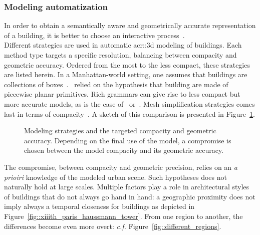         \subsubsection{Modeling automatization}
            In order to obtain a semantically aware and geometrically accurate representation of a building, it is better to choose an interactive process~\parencite{musialski2013survey}.\\
            Different strategies are used in automatic \gls{acr::3d} modeling of buildings.
            Each method type targets a specific resolution, balancing between compacity and geometric accuracy.
            Ordered from the most to the less compact, these strategies are listed herein.
            In a Manhattan-world setting, one assumes that buildings are collections of boxes~\parencite{vanegas2010building, li2016manhattan}.~\textcite{lafarge_ijcv12, nan2017polyfit}
            relied on the hypothesis that building are made of piecewise planar primitives.
            Rich grammars can give rise to less compact but more accurate models, as is the case of~\textcite{demir2015procedural} or~\textcite{zeng2018neural}.
            Mesh simplification strategies comes last in terms of compacity~\parencite{verdie2015lod, zhou20102}.
            A sketch of this comparison is presented in Figure~\ref{fig::modeling_strategies}.\\
            \begin{figure}[htpb]
                \centering
                            
                \caption{
                    \label{fig::modeling_strategies} Modeling strategies and the targeted compacity and geometric accuracy.
                    Depending on the final use of the model, a compromise is chosen between the model compacity and its geometric accuracy.
                }
            \end{figure}
            The compromise, between compacity and geometric precision, relies on an \textit{a prioiri} knowledge of the modeled urban scene.
            Such hypotheses does not naturally hold at large scales.
            Multiple factors play a role in architectural styles of buildings that do not always go hand in hand:
            a geographic proximity does not imply always a temporal closeness for buildings as depicted in Figure~\ref{fig::xiiith_paris_haussmann_tower}.
            From one region to another, the differences become even more overt: \textit{c.f.} Figure~\ref{fig::different_regions}.
